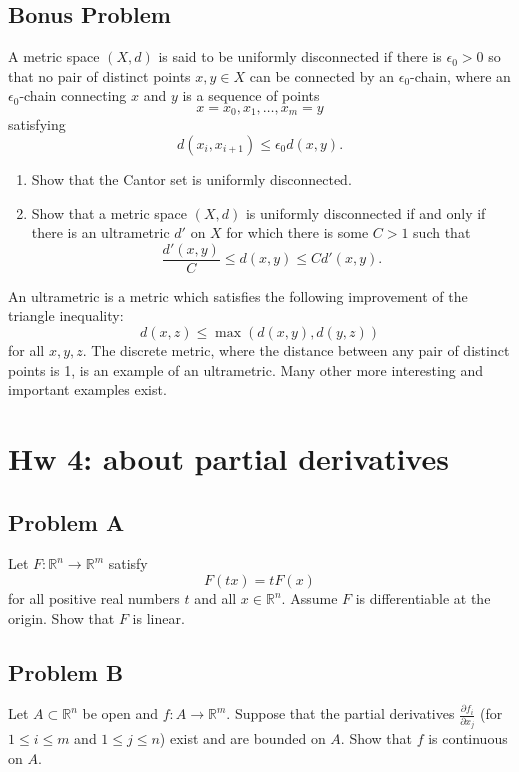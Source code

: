 \documentclass[lang=cn,11pt]{template}
\begin{document}
\section*{Bonus Problem}
A metric space \( (X, d) \) is said to be uniformly disconnected if there is \( \epsilon_0 > 0 \) so that no pair of distinct points \( x, y \in X \) can be connected by an \( \epsilon_0 \)-chain, where an \( \epsilon_0 \)-chain connecting \( x \) and \( y \) is a sequence of points
\[
x = x_0, x_1, \dots, x_m = y
\]
satisfying
\[
d(x_i, x_{i+1}) \leq \epsilon_0 d(x, y).
\]
\begin{enumerate}
    \item Show that the Cantor set is uniformly disconnected.
    \item Show that a metric space \( (X, d) \) is uniformly disconnected if and only if there is an ultrametric \( d' \) on \( X \) for which there is some \( C > 1 \) such that
    \[
    \frac{d'(x, y)}{C} \leq d(x, y) \leq C d'(x, y).
    \]
\end{enumerate}
An ultrametric is a metric which satisfies the following improvement of the triangle inequality:
\[
d(x, z) \leq \max(d(x, y), d(y, z))
\]
for all \( x, y, z \). The discrete metric, where the distance between any pair of distinct points is 1, is an example of an ultrametric. Many other more interesting and important examples exist.





\chapter*{Hw 4: about partial derivatives}

\section*{Problem A}
Let \( F : \mathbb{R}^n \to \mathbb{R}^m \) satisfy
\[
F(tx) = tF(x)
\]
for all positive real numbers \( t \) and all \( x \in \mathbb{R}^n \). Assume \( F \) is differentiable at the origin. Show that \( F \) is linear.

\section*{Problem B}
Let \( A \subset \mathbb{R}^n \) be open and \( f : A \to \mathbb{R}^m \). Suppose that the partial derivatives \( \frac{\partial f_i}{\partial x_j} \) (for \( 1 \leq i \leq m \) and \( 1 \leq j \leq n \)) exist and are bounded on \( A \). Show that \( f \) is continuous on \( A \).
\end{document}
